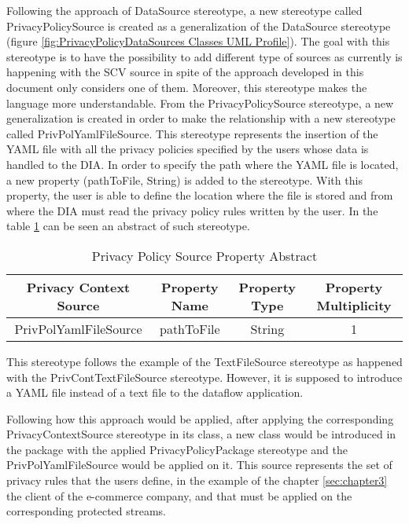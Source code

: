 Following the approach of DataSource stereotype, a new stereotype called PrivacyPolicySource is created as a generalization of the DataSource stereotype (figure \ref{fig:PrivacyPolicyDataSources Classes UML Profile}). The goal with this stereotype is to have the possibility to add different type of sources as currently is happening with the SCV source in spite of the approach developed in this document only considers one of them. Moreover, this stereotype makes the language more understandable. From the PrivacyPolicySource stereotype, a new generalization is created in order to make the relationship with a new stereotype called PrivPolYamlFileSource. This stereotype represents the insertion of the YAML file with all the privacy policies specified by the users whose data is handled to the DIA. In order to specify the path where the YAML file is located, a new property (pathToFile, String) is added to the stereotype. With this property, the user is able to define the location where the file is stored and from where the DIA must read the privacy policy rules written by the user. In the table \ref{Privacy Policy Source Property Abstract} can be seen an abstract of such stereotype.

\begin{table}[h!]
\centering
	\begin{tabular}{||c|c|c|c||} 
	\hline\hline
	Privacy Context Source & Property Name & Property Type & Property Multiplicity \\ [1ex] 
	\hline\hline
	PrivPolYamlFileSource & pathToFile & String & 1 \\
	\hline\hline
	\end{tabular}
\caption{Privacy Policy Source Property Abstract}
\label{Privacy Policy Source Property Abstract}
\end{table}

This stereotype follows the example of the TextFileSource stereotype as happened with the PrivContTextFileSource stereotype. However, it is supposed to introduce a YAML file instead of a text file to the dataflow application.

Following how this approach would be applied, after applying the corresponding PrivacyContextSource stereotype in its class, a new class would be introduced in the package with the applied PrivacyPolicyPackage stereotype and the PrivPolYamlFileSource would be applied on it. This source represents the set of privacy rules that the users define, in the example of the chapter \ref{sec:chapter3} the client of the e-commerce company, and that must be applied on the corresponding protected streams.

